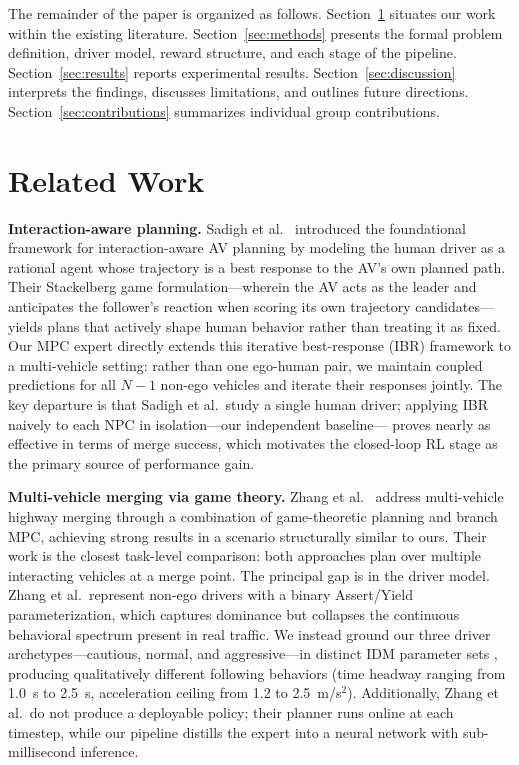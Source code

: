 \documentclass[conference]{IEEEtran}
\begin{document}
The remainder of the paper is organized as follows. Section~\ref{sec:related}
situates our work within the existing literature. Section~\ref{sec:methods}
presents the formal problem definition, driver model, reward structure, and
each stage of the pipeline. Section~\ref{sec:results} reports experimental
results. Section~\ref{sec:discussion} interprets the findings, discusses
limitations, and outlines future directions. Section~\ref{sec:contributions}
summarizes individual group contributions.

\section{Related Work}
\label{sec:related}

\textbf{Interaction-aware planning.}
Sadigh et al.\ \cite{sadigh2016planning} introduced the foundational framework
for interaction-aware AV planning by modeling the human driver as a rational
agent whose trajectory is a best response to the AV's own planned path.
Their Stackelberg game formulation---wherein the AV acts as the leader and
anticipates the follower's reaction when scoring its own trajectory
candidates---yields plans that actively shape human behavior rather than
treating it as fixed.
Our MPC expert directly extends this iterative best-response (IBR)
framework to a multi-vehicle setting: rather than one ego-human pair, we
maintain coupled predictions for all $N-1$ non-ego vehicles and iterate
their responses jointly.
The key departure is that Sadigh et al.\ study a single human driver;
applying IBR naively to each NPC in isolation---our independent baseline---
proves nearly as effective in terms of merge success, which motivates the
closed-loop RL stage as the primary source of performance gain.

\textbf{Multi-vehicle merging via game theory.}
Zhang et al.\ \cite{zhang2025multiagent} address multi-vehicle highway merging
through a combination of game-theoretic planning and branch MPC, achieving
strong results in a scenario structurally similar to ours.
Their work is the closest task-level comparison: both approaches plan over
multiple interacting vehicles at a merge point.
The principal gap is in the driver model.
Zhang et al.\ represent non-ego drivers with a binary Assert/Yield
parameterization, which captures dominance but collapses the continuous
behavioral spectrum present in real traffic.
We instead ground our three driver archetypes---cautious, normal, and
aggressive---in distinct IDM parameter sets \cite{treiber2000congested},
producing qualitatively different following behaviors (time headway ranging
from 1.0~s to 2.5~s, acceleration ceiling from 1.2 to 2.5~m/s$^2$).
Additionally, Zhang et al.\ do not produce a deployable policy; their
planner runs online at each timestep, while our pipeline distills the
expert into a neural network with sub-millisecond inference.
\end{document}
